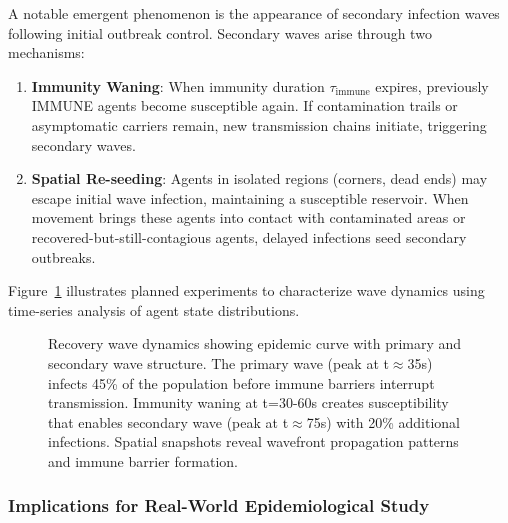 A notable emergent phenomenon is the appearance of secondary infection waves following initial outbreak control. Secondary waves arise through two mechanisms:

\begin{enumerate}
    \item \textbf{Immunity Waning}: When immunity duration $\tau_{\text{immune}}$ expires, previously IMMUNE agents become susceptible again. If contamination trails or asymptomatic carriers remain, new transmission chains initiate, triggering secondary waves.
    
    \item \textbf{Spatial Re-seeding}: Agents in isolated regions (corners, dead ends) may escape initial wave infection, maintaining a susceptible reservoir. When movement brings these agents into contact with contaminated areas or recovered-but-still-contagious agents, delayed infections seed secondary outbreaks.
\end{enumerate}

Figure~\ref{fig:recovery-waves} illustrates planned experiments to characterize wave dynamics using time-series analysis of agent state distributions.

\begin{figure}[t]
\centering
{}
\caption{Recovery wave dynamics showing epidemic curve with primary and secondary wave structure. The primary wave (peak at t$\approx$35s) infects 45\% of the population before immune barriers interrupt transmission. Immunity waning at t=30-60s creates susceptibility that enables secondary wave (peak at t$\approx$75s) with 20\% additional infections. Spatial snapshots reveal wavefront propagation patterns and immune barrier formation.}
\label{fig:recovery-waves}
\end{figure}

\subsubsection{Implications for Real-World Epidemiological Study}
\label{sec:epidemiological-implications}

